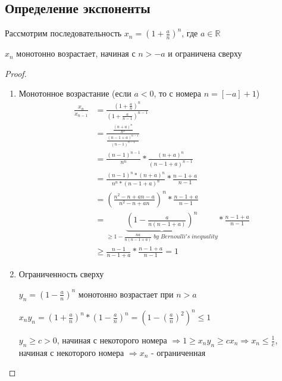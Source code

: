 \subsection{Определение экспоненты}
    Рассмотрим последовательность $x_n = (1 + \frac{a}{n})^n$, где $a \in \mathbb{R}$
    \begin{theorem-non}
    $x_n$ монотонно возрастает, начиная с $n > -a$ и ограничена сверху
    \end{theorem-non}
    \begin{proof} \quad \\
        \begin{enumerate}
        \item Монотонное возрастание (если $a < 0$, то с номера $n = [-a] + 1$)
        \begin{equation*}
            \begin{split}
                \frac{x_n}{x_{n - 1}} &= \frac{(1 + \frac{a}{n})^n}{(1 + \frac{a}{n - 1})^{n - 1}} \\ 
                &= \frac{\frac{(n + a)^n}{n^n}}{\frac{(n - 1 + a)^{n - 1}}{(n - 1)^{n - 1}}} \\ 
                &= \frac{(n - 1)^{n - 1}}{n^n} * \frac{(n + a)^n}{(n - 1 + a)^{n - 1}} \\
                &= \frac{(n - 1)^n * (n + a)^n}{n^n * (n - 1 + a)^n } * \frac{n - 1 + a}{n - 1} \\
                &= (\frac{n^2 - n + an - a}{n^2 - n + an})^n * \frac{n - 1 + a}{n - 1} \\ 
                &= \underbrace{(1 - \frac{a}{n(n - 1 + a)})^n}_{\geqslant 1 - \frac{na}{n(n - 1 + a)} \;by\; Bernoulli's\; inequality} * \frac{n - 1 + a}{n - 1} \\
                &\geqslant\frac{n - 1}{n - 1 + a} * \frac{n - 1 + a}{n - 1} = 1
            \end{split}
        \end{equation*}
        \item Ограниченность сверху
        
        $y_n = (1 - \frac{a}{n})^n$ монотонно возрастает при $n > a$ 
        
        $x_ny_n = (1 + \frac{a}{n})^n * (1 - \frac{a}{n})^n = (1 - (\frac{a}{n})^2)^n \leqslant 1$
        
        $y_n \geqslant c > 0$, начиная с некоторого номера $\Rightarrow 1 \geqslant x_ny_n \geqslant cx_n \Rightarrow x_n \leqslant \frac{1}{c}$, начиная с некоторого номера $\Rightarrow x_n$ - ограниченная
        \end{enumerate}
    \end{proof}
